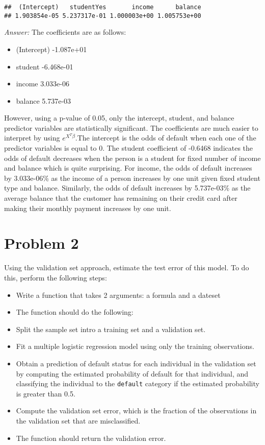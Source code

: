 \documentclass[11pt - \usepackage{enumerate},]{article}
\providecommand{\tightlist}{%
  \setlength{\itemsep}{0pt}\setlength{\parskip}{0pt}}
\begin{document}
\begin{verbatim}
##  (Intercept)   studentYes       income      balance 
## 1.903854e-05 5.237317e-01 1.000003e+00 1.005753e+00
\end{verbatim}

\textit{Answer: } The coefficients are as follows:

\begin{itemize}
\item (Intercept) -1.087e+01
\item student     -6.468e-01
\item income       3.033e-06
\item balance      5.737e-03
\end{itemize}

However, using a p-value of 0.05, only the intercept, student, and
balance predictor variables are statistically significant. The
coefficients are much easier to interpret by using \(e^{X^T\beta}\).The
intercept is the odds of default when each one of the predictor
variables is equal to 0. The student coefficient of -0.6468 indicates
the odds of default decreases when the person is a student for fixed
number of income and balance which is quite surprising. For income, the
odds of default increases by 3.033e-06\% as the income of a person
increases by one unit given fixed student type and balance. Similarly,
the odds of default increases by 5.737e-03\% as the average balance that
the customer has remaining on their credit card after making their
monthly payment increases by one unit.

\section{Problem 2}\label{problem-2}

Using the validation set approach, estimate the test error of this
model. To do this, perform the following steps:

\begin{itemize}
\tightlist
\item
  Write a function that takes 2 arguments: a formula and a dateset
\item
  The function should do the following:
\item
  Split the sample set intro a training set and a validation set.
\item
  Fit a multiple logistic regression model using only the training
  observations.
\item
  Obtain a prediction of default status for each individual in the
  validation set by computing the estimated probability of default for
  that individual, and classifying the individual to the
  \texttt{default} category if the estimated probability is greater than
  0.5.
\item
  Compute the validation set error, which is the fraction of the
  observations in the validation set that are misclassified.
\item
  The function should return the validation error.
\end{itemize}
\end{document}
